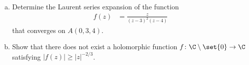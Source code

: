 \documentclass[10pt]{mypackage}
\begin{document}
\RaggedRight

\begin{problem}[Problem 2]\hfill
  \begin{enumerate}[(a)]
    \item Determine the Laurent series expansion of the function
      \begin{align*}
        f(z) &= \frac{z}{\left( z-3 \right)^2\left( z-4 \right)}
      \end{align*}
      that converges on $A\left( 0,3,4 \right)$. 
    \item Show that there does not exist a holomorphic function $f\colon \C\setminus \set{0}\rightarrow \C$ satisfying $ \left\vert f(z) \right\vert\geq \left\vert z \right\vert^{-2/3} $.
  \end{enumerate}
\end{problem}
\end{document}
